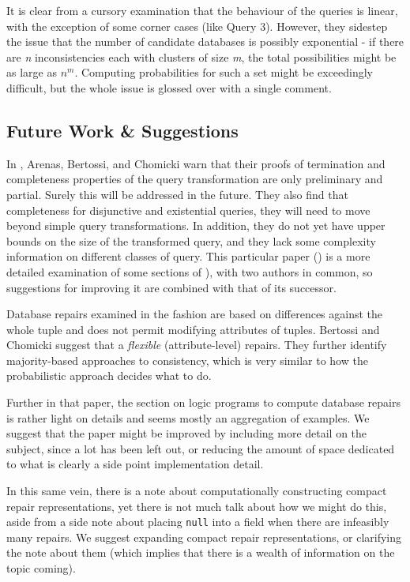 \documentclass[a4paper]{report}
\begin{document}
It is clear from a cursory examination that the behaviour of the queries is linear, with the exception of some corner cases (like Query 3). However, they sidestep the issue that the number of candidate databases is possibly exponential - if there are \textit{n} inconsistencies each with clusters of size \textit{m}, the total possibilities might be as large as $n^{m}$. Computing probabilities for such a set might be exceedingly difficult, but the whole issue is glossed over with a single comment.

\subsection*{Future Work \& Suggestions}

In \cite{CQI}, Arenas, Bertossi, and Chomicki warn that their proofs of termination and completeness properties of the query transformation are only preliminary and partial. Surely this will be addressed in the future. They also find that completeness for disjunctive and existential queries, they will need to move beyond simple query transformations. In addition, they do not yet have upper bounds on the size of the transformed query, and they lack some complexity information on different classes of query. This particular paper (\cite{CQI}) is a more detailed examination of some sections of \cite{CQ}), with two authors in common, so suggestions for improving it are combined with that of its successor.

Database repairs examined in the \cite{CQ} fashion are based on differences against the whole tuple and does not permit modifying attributes of tuples. Bertossi and Chomicki suggest that a \textit{flexible} (attribute-level) repairs. They further identify majority-based approaches to consistency, which is very similar to how the probabilistic approach decides what to do.

Further in that paper, the section on logic programs to compute database repairs is rather light on details and seems mostly an aggregation of examples. We suggest that the paper might be improved by including more detail on the subject, since a lot has been left out, or reducing the amount of space dedicated to what is clearly a side point implementation detail. 

In this same vein, there is a note about computationally constructing compact repair representations, yet there is not much talk about how we might do this, aside from a side note about placing \texttt{null} into a field when there are infeasibly many repairs. We suggest expanding compact repair representations, or clarifying the note about them (which implies that there is a wealth of information on the topic coming).
\end{document}

